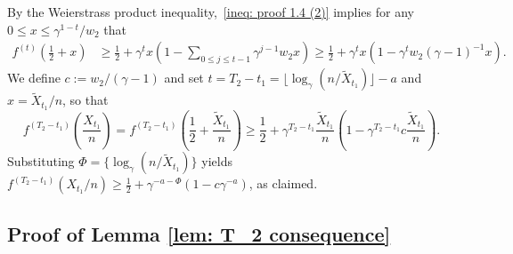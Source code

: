 \documentclass[11pt]{article}
\numberwithin{theorem}{section}
\begin{document}
By the Weierstrass product inequality,~\eqref{ineq: proof 1.4 (2)} implies for any $0\leq x \leq \gamma^{1-t}/w_2$
that
\begin{align}
\label{ineq: proof 1.4 (3)}
    f^{(t)}\left(\frac{1}{2}+x\right) &\geq \frac{1}{2}+ \gamma^{t} x  \left(1- \sum_{0\leq j\leq t-1}\gamma^{j-1}w_2 x\right) \geq \frac{1}{2}+ \gamma^{t}x   \left(1- \gamma^{t}w_2  (\gamma-1)^{-1}x\right).
\end{align}
We define $c:=w_2/(\gamma-1)$ and set $t= T_2-t_1= \lfloor \log_\gamma (n/\tilde X_{t_1})\rfloor-a$ and $x=\tilde X_{t_1}/n$, so that 
\[
f^{(T_2-t_1)}\left(\frac{X_{t_1}}{n}\right) =f^{(T_2-t_1)}\left(\frac12+\frac{\tilde X_{t_1}}{n}\right)  \geq \frac{1}{2}+ \gamma^{T_2-t_1} \frac{\tilde X_{t_1}}{n}  \left(1- \gamma^{T_2-t_1}c\frac{\tilde X_{t_1}}{n}\right).
\]
Substituting $\Phi = \{\log_\gamma(n/\tilde X_{t_1})\}$ yields
$f^{(T_2-t_1)}(X_{t_1} / n) \geq \frac{1}{2}+ \gamma^{-a-\Phi} \left(1- c\gamma^{-a}\right)$, as claimed.



\subsection{Proof of Lemma \ref{lem: T_2 consequence}}\label{subsec: proof of T_2 consequences}
\end{document}
